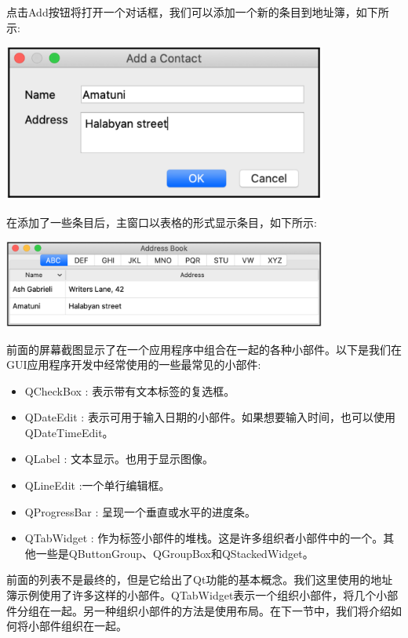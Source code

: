点击Add按钮将打开一个对话框，我们可以添加一个新的条目到地址簿，如下所示: \par

\begin{center}
	\includegraphics[width=0.8\textwidth]{content/Section-2/Chapter-14/14}
\end{center}

在添加了一些条目后，主窗口以表格的形式显示条目，如下所示: \par

\begin{center}
	\includegraphics[width=0.8\textwidth]{content/Section-2/Chapter-14/15}
\end{center}

前面的屏幕截图显示了在一个应用程序中组合在一起的各种小部件。以下是我们在GUI应用程序开发中经常使用的一些最常见的小部件: \par

\begin{itemize}
	\item QCheckBox : 表示带有文本标签的复选框。
	\item QDateEdit : 表示可用于输入日期的小部件。如果想要输入时间，也可以使用QDateTimeEdit。
	\item QLabel : 文本显示。也用于显示图像。
	\item QLineEdit :一个单行编辑框。
	\item QProgressBar : 呈现一个垂直或水平的进度条。
	\item QTabWidget : 作为标签小部件的堆栈。这是许多组织者小部件中的一个。其他一些是QButtonGroup、QGroupBox和QStackedWidget。
\end{itemize}

前面的列表不是最终的，但是它给出了Qt功能的基本概念。我们这里使用的地址簿示例使用了许多这样的小部件。QTabWidget表示一个组织小部件，将几个小部件分组在一起。另一种组织小部件的方法是使用布局。在下一节中，我们将介绍如何将小部件组织在一起。 \par

